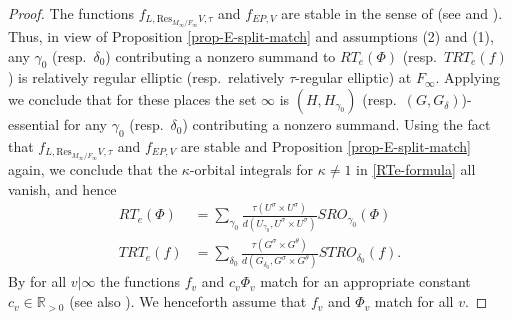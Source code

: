 \documentclass[12pt]{amsart}
\theoremstyle{remark}
\numberwithin{equation}{section}
\newcommand{\RR}{\mathbb{R}}
\theoremstyle{definition}
\numberwithin{equation}{subsection}
\begin{document}
\begin{proof}
The functions $f_{L,\mathrm{Res}_{M_{\infty}/F_{\infty}}V,\tau}$ and $f_{EP,V}$ are stable in the sense of \cite[D\'efinition 3.8.2]{Lab} (see \cite[Th\'eor\`eme A.1.1]{ClozLab} and \cite[Th\'eor\`eme 7.1]{LabCM}).  Thus, in view of Proposition \ref{prop-E-split-match} and assumptions (2) and (1), any $\gamma_0$ (resp.~$\delta_0$) contributing a nonzero summand to $RT_e(\Phi)$ (resp.~$TRT_e(f)$) is relatively regular elliptic (resp.~relatively $\tau$-regular elliptic) at $F_{\infty}$.  Applying \cite[Proposition 1.9.6 and Lemme 1.9.7]{Lab} we conclude that for these places the set $\infty$ is $(H,H_{\gamma_0})$ (resp.~$(G,G_{\delta})$)-essential for any $\gamma_0$ (resp.~$\delta_0$) contributing a nonzero summand.
Using the fact that $f_{L,\mathrm{Res}_{M_{\infty}/F_{\infty}}V,\tau}$ and $f_{EP,V}$ are stable and Proposition \ref{prop-E-split-match} again, we conclude that
the $\kappa$-orbital integrals for $\kappa \neq 1$ in \eqref{RTe-formula} all vanish, and hence
\begin{align*}
RT_e(\Phi)&=\sum_{\gamma_0}
\frac{\tau(U^{\sigma} \times U^{\sigma})}{d(U_{\gamma_0},U^{\sigma} \times U^{\sigma})}
SRO_{\gamma_0}(\Phi)\\
TRT_e(f)&=\sum_{\delta_0}
\frac{\tau(G^{\sigma} \times G^{\theta})}{
d(G_{\delta_0},G^{\sigma} \times G^{\theta})}
STRO_{\delta_0}(f).
\end{align*}
By \cite[Corollaire A.1.2]{Lab} for all $v|\infty$ the functions $f_{v}$ and $c_v\Phi_v$ match for an appropriate constant $c_v \in \RR_{>0}$ (see also \cite[Th\'eor\`eme 7.1]{LabCM}).  We henceforth assume that $f_v$ and $\Phi_v$ match for all $v$.


\end{proof}
\end{document}
